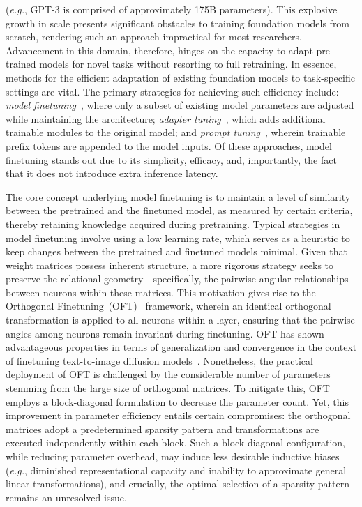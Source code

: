 (\emph{e.g.}, GPT-3 is comprised of approximately 175B parameters). This explosive growth in scale presents significant obstacles to training foundation models from scratch, rendering such an approach impractical for most researchers. Advancement in this domain, therefore, hinges on the capacity to adapt pre-trained models for novel tasks without resorting to full retraining. In essence, methods for the efficient adaptation of existing foundation models to task-specific settings are vital. The primary strategies for achieving such efficiency include: \emph{model finetuning}~\cite{hulora2022,zaken2022bitfit,guo2020parameter,raffel2020exploring,qiu2023controlling,zhang2022adaptive,chavan2023one}, where only a subset of existing model parameters are adjusted while maintaining the architecture; \emph{adapter tuning}~\cite{rebuffi2017learning,houlsby2019parameter,pfeiffer2020adapterfusion,lin2020exploring,he2021towards}, which adds additional trainable modules to the original model; and \emph{prompt tuning}~\cite{li2021prefix,lester2021power}, wherein trainable prefix tokens are appended to the model inputs. Of these approaches, model finetuning stands out due to its simplicity, efficacy, and, importantly, the fact that it does not introduce extra inference latency.

The core concept underlying model finetuning is to maintain a level of similarity between the pretrained and the finetuned model, as measured by certain criteria, thereby retaining knowledge acquired during pretraining. Typical strategies in model finetuning involve using a low learning rate, which serves as a heuristic to keep changes between the pretrained and finetuned models minimal. Given that weight matrices possess inherent structure, a more rigorous strategy seeks to preserve the relational geometry—specifically, the pairwise angular relationships between neurons within these matrices. This motivation gives rise to the Orthogonal Finetuning~(OFT)~\cite{qiu2023controlling} framework, wherein an identical orthogonal transformation is applied to all neurons within a layer, ensuring that the pairwise angles among neurons remain invariant during finetuning. OFT has shown advantageous properties in terms of generalization and convergence in the context of finetuning text-to-image diffusion models~\cite{qiu2023controlling}. Nonetheless, the practical deployment of OFT is challenged by the considerable number of parameters stemming from the large size of orthogonal matrices. To mitigate this, OFT employs a block-diagonal formulation to decrease the parameter count. Yet, this improvement in parameter efficiency entails certain compromises: the orthogonal matrices adopt a predetermined sparsity pattern and transformations are executed independently within each block. Such a block-diagonal configuration, while reducing parameter overhead, may induce less desirable inductive biases (\emph{e.g.}, diminished representational capacity and inability to approximate general linear transformations), and crucially, the optimal selection of a sparsity pattern remains an unresolved issue.

